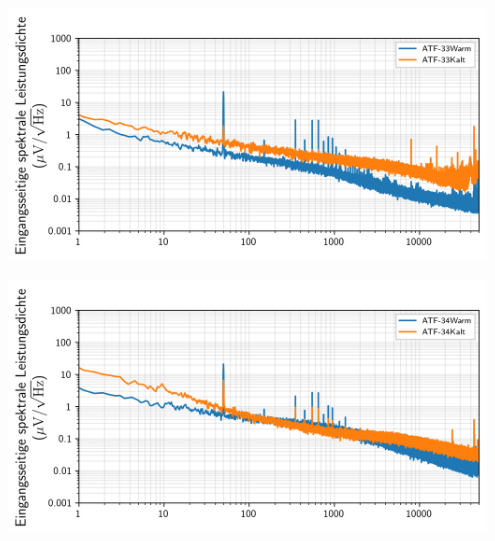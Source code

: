 \begin{minipage}[!c]{\textwidth}

\begin{minipage}[c]{\textwidth}
\includegraphics[width=0.95\textwidth]{./fig/Rauschen/F33.png}
\vspace{-0.8cm}
\label{subfig:33}
\end{minipage}

\begin{minipage}[c]{\textwidth}
\includegraphics[width=0.95\textwidth]{./fig/Rauschen/F34.png}
\vspace{-0.8cm}
\label{subfig:34}
\end{minipage}


\end{minipage}
